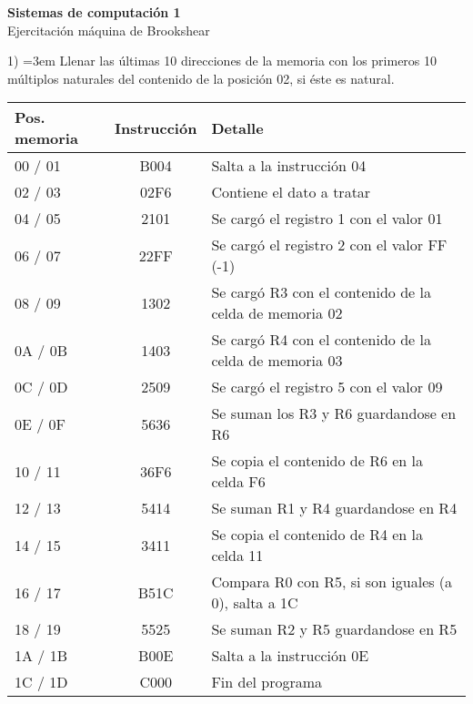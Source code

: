 \documentclass[a4paper,12pt]{article}
\begin{document}
	
	\begin{center}
		
		\LARGE \textbf{Sistemas de computación 1} \\[0.5cm]
		\LARGE Ejercitación máquina de Brookshear \\
	\end{center}
	
	\vspace{1cm}
	
	1) \hangindent=3em Llenar las últimas 10 direcciones de la memoria con los primeros 10 múltiplos naturales del contenido de la	posición 02, si éste es natural.

	\vspace{0.5cm}

	\renewcommand{\arraystretch}{1.1}
	\begin{tabular}{l|c|l}
		\textbf{Pos. memoria} &\textbf{Instrucción} & \textbf{Detalle}\\
		\hline
		00 / 01 & B004  & Salta a la instrucción 04 \\ 
		02 / 03 & 02F6  & Contiene el dato a tratar \\
		04 / 05 & 2101  & Se cargó el registro 1 con el valor 01 \\
		06 / 07 & 22FF  & Se cargó el registro 2 con el valor FF (-1) \\
		08 / 09 & 1302  & Se cargó R3 con el contenido de la celda de memoria 02 \\
		0A / 0B & 1403  & Se cargó R4 con el contenido de la celda de memoria 03 \\
		0C / 0D & 2509  & Se cargó el registro 5 con el valor 09\\
		0E / 0F & 5636  & Se suman los R3 y R6 guardandose en R6 \\
		10 / 11 & 36F6  & Se copia el contenido de R6 en la celda F6 \\
		12 / 13 & 5414  & Se suman R1 y R4 guardandose en R4 \\
		14 / 15 & 3411  & Se copia el contenido de R4 en la celda 11 \\
		16 / 17 & B51C  & Compara R0 con R5, si son iguales (a 0), salta a 1C \\
		18 / 19 & 5525  & Se suman R2 y R5 guardandose en R5 \\
		1A / 1B & B00E  & Salta a la instrucción 0E \\
		1C / 1D & C000  & Fin del programa \\
	\end{tabular}
\end{document}

